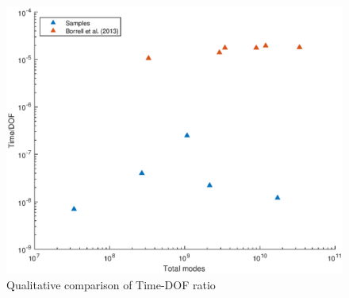 \begin{figure}
\begin{center}
\includegraphics[scale=0.55]{grafici/time_dof}
\caption{Qualitative comparison of Time-DOF ratio}
\label{hyper}
\end{center}
\end{figure}
